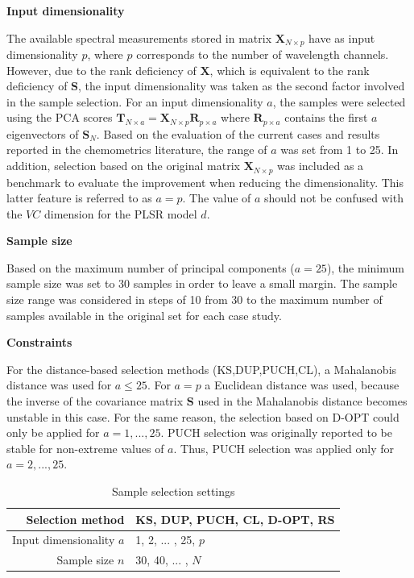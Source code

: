\documentclass[journal=ancham,manuscript=article]{achemso}
\begin{document}
\textbf{Input dimensionality}

The available spectral measurements stored in matrix $\mathbf{X}_{N\times p}$ have as input dimensionality $p$, where $p$ corresponds to the number of wavelength channels. However, due to the rank deficiency of $\mathbf{X}$, which is equivalent to the rank deficiency of $\mathbf{S}$, the input dimensionality was taken as the second factor involved in the sample selection. For an input dimensionality $a$, the samples were selected using the PCA scores $\mathbf{T}_{N\times a} = \mathbf{X}_{N\times p}\mathbf{R}_{p\times a}$ where $\mathbf{R}_{p\times a}$ contains the first $a$ eigenvectors of $\mathbf{S}_N$. Based on the evaluation of the current cases and results reported in the chemometrics literature, the range of $a$ was set from 1 to 25. In addition, selection based on the original matrix $\mathbf{X}_{N\times p}$ was included as a benchmark to evaluate the improvement when reducing the dimensionality. This latter feature is referred to as $a=p$. The value of $a$ should not be confused with the $VC$ dimension for the PLSR model $d$. 

\textbf{Sample size}

Based on the maximum number of principal components ($a=25$), the minimum sample size was set to 30 samples in order to leave a small margin. The sample size range was considered in steps of 10 from 30 to the maximum number of samples available in the original set for each case study. 

\textbf{Constraints}

For the distance-based selection methods (KS,DUP,PUCH,CL), a Mahalanobis distance was used for $a\le 25$.  For $a=p$ a Euclidean distance was used, because the inverse of the covariance matrix $\mathbf{S}$ used in the Mahalanobis distance becomes unstable in this case. For the same reason, the selection based on D-OPT could only be applied for $a=1,...,25$. PUCH selection was originally reported to be stable for non-extreme values of $a$\cite{Puchwein1988}. Thus, PUCH selection was applied only for $a=2,...,25$.

\begin{table}[t]
\centering
\begin{tabular}{|r|l|} 
\hline
Selection method & KS, DUP, PUCH, CL, D-OPT, RS\\
\hline
Input dimensionality $a$ & 1, 2, ... , 25, $p$ \\
\hline
Sample size $n$ & 30, 40, ... , $N$ \\
\hline

\end{tabular}
\caption{Sample selection settings}
\label{tab_samplesel_settings_exhaustive_search}
\end{table}
\end{document}
